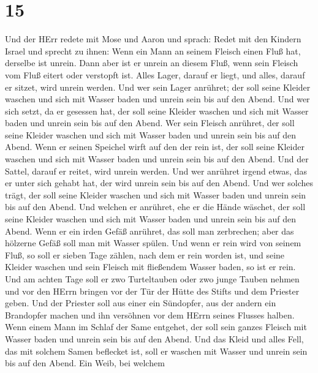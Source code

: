 \hypertarget{section-14}{%
\section{15}\label{section-14}}

 Und der HErr redete mit Mose und Aaron und sprach:
 Redet mit den Kindern Israel und sprecht zu ihnen: Wenn ein
Mann an seinem Fleisch einen Fluß hat, derselbe ist unrein. 
Dann aber ist er unrein an diesem Fluß, wenn sein Fleisch vom Fluß
eitert oder verstopft ist.  Alles Lager, darauf er liegt,
und alles, darauf er sitzet, wird unrein werden.  Und wer
sein Lager anrühret; der soll seine Kleider waschen und sich mit Wasser
baden und unrein sein bis auf den Abend.  Und wer sich
setzt, da er gesessen hat, der soll seine Kleider waschen und sich mit
Wasser baden und unrein sein bis auf den Abend.  Wer sein
Fleisch anrühret, der soll seine Kleider waschen und sich mit Wasser
baden und unrein sein bis auf den Abend.  Wenn er seinen
Speichel wirft auf den der rein ist, der soll seine Kleider waschen und
sich mit Wasser baden und unrein sein bis auf den Abend. 
Und der Sattel, darauf er reitet, wird unrein werden.  Und
wer anrühret irgend etwas, das er unter sich gehabt hat, der wird unrein
sein bis auf den Abend. Und wer solches trägt, der soll seine Kleider
waschen und sich mit Wasser baden und unrein sein bis auf den Abend.
 Und welchen er anrühret, ehe er die Hände wäschet, der
soll seine Kleider waschen und sich mit Wasser baden und unrein sein bis
auf den Abend.  Wenn er ein irden Gefäß anrühret, das soll
man zerbrechen; aber das hölzerne Gefäß soll man mit Wasser spülen.
 Und wenn er rein wird von seinem Fluß, so soll er sieben
Tage zählen, nach dem er rein worden ist, und seine Kleider waschen und
sein Fleisch mit fließendem Wasser baden, so ist er rein. 
Und am achten Tage soll er zwo Turteltauben oder zwo junge Tauben nehmen
und vor den HErrn bringen vor der Tür der Hütte des Stifts und dem
Priester geben.  Und der Priester soll aus einer ein
Sündopfer, aus der andern ein Brandopfer machen und ihn versöhnen vor
dem HErrn seines Flusses halben.  Wenn einem Mann im Schlaf
der Same entgehet, der soll sein ganzes Fleisch mit Wasser baden und
unrein sein bis auf den Abend.  Und das Kleid und alles
Fell, das mit solchem Samen beflecket ist, soll er waschen mit Wasser
und unrein sein bis auf den Abend.  Ein Weib, bei welchem
